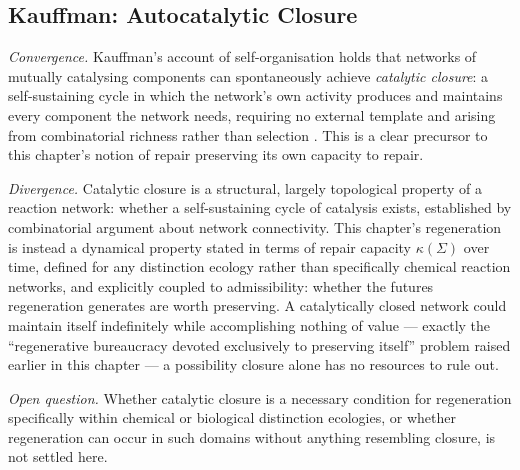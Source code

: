 \documentclass[12pt,twoside,openright]{book}
\begin{document}
\subsection*{Kauffman: Autocatalytic Closure}

\emph{Convergence.} Kauffman's account of self-organisation
holds that networks of mutually catalysing components can
spontaneously achieve \emph{catalytic closure}: a self-sustaining
cycle in which the network's own activity produces and maintains
every component the network needs, requiring no external
template and arising from combinatorial richness rather than
selection \parencite{kauffman1993}. This is a clear precursor to
this chapter's notion of repair preserving its own capacity to
repair.

\emph{Divergence.} Catalytic closure is a structural, largely
topological property of a reaction network: whether a
self-sustaining cycle of catalysis exists, established by
combinatorial argument about network connectivity. This
chapter's regeneration is instead a dynamical property stated in
terms of repair capacity $\kappa(\Sigma)$ over time, defined for
any distinction ecology rather than specifically chemical
reaction networks, and explicitly coupled to admissibility:
whether the futures regeneration generates are worth preserving.
A catalytically closed network could maintain itself
indefinitely while accomplishing nothing of value --- exactly
the ``regenerative bureaucracy devoted exclusively to preserving
itself'' problem raised earlier in this chapter --- a
possibility closure alone has no resources to rule out.

\emph{Open question.} Whether catalytic closure is a necessary
condition for regeneration specifically within chemical or
biological distinction ecologies, or whether regeneration can
occur in such domains without anything resembling closure, is
not settled here.
\end{document}
